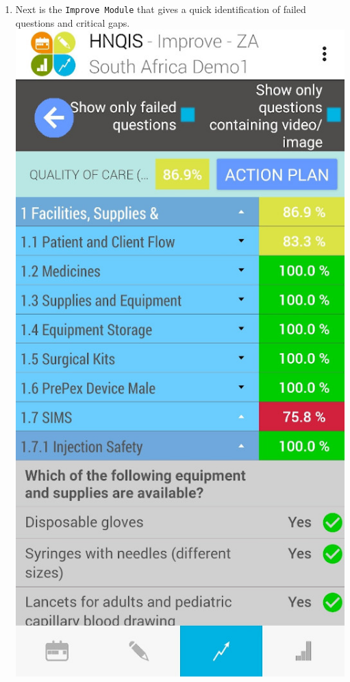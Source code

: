 \documentclass[]{book}
\providecommand{\tightlist}{%
  \setlength{\itemsep}{0pt}\setlength{\parskip}{0pt}}
\begin{document}
\begin{enumerate}
\def\labelenumi{\arabic{enumi}.}
\setcounter{enumi}{4}
\tightlist
\item
  Next is the \texttt{Improve\ Module} that gives a quick identification of failed questions and critical gaps.
  \includegraphics{images/hnqis-improve.jpg}
\end{enumerate}
\end{document}
